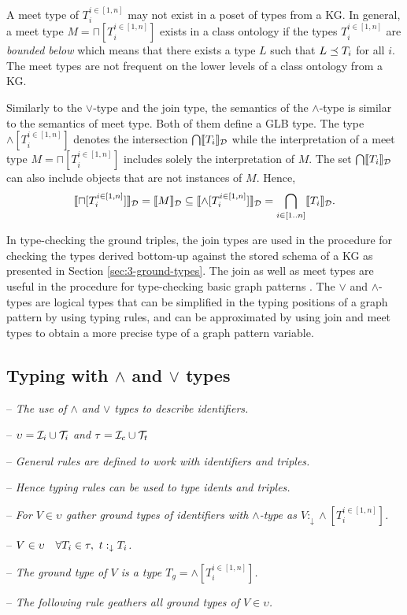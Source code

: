 \documentclass[runningheads]{llncs}
\newcommand{\darr}{\downarrow}
\newcommand{\llb}{\llbracket}
\newcommand{\rrb}{\rrbracket}
\newcommand{\I}{{\cal I}}
\newcommand{\T}{{\cal T}}
\newcommand{\notes}[1]{\noindent\begin{small}-- \emph{#1}\hfill\break\end{small}}
\newcommand{\nnotes}[1]{\indent\begin{small}-- \emph{#1}\hfill\break\end{small}}
\newcommand{\ennotes}[1]{\indent\begin{small}-- \emph{#1}\hfill\end{small}}
\begin{document}
A meet type of $T_i^{i\in[1,n]}$ may not exist in a poset of types from a
KG. In general, a meet type $M=\sqcap[T_i^{i\in[1,n]}]$ exists in a class
ontology if the types $T_i^{i\in[1,n]}$ are \emph{bounded below} which means
that there exists a type $L$ such that $L\preceq\/T_i$ for all
$i$. The meet types \cite{Pierce2002} are not frequent on the
lower levels of a class ontology from a KG.

Similarly to the $\lor$-type and the join type, the semantics of the
$\land$-type is similar to the semantics of meet type. Both of them
define a GLB type. The type $\land[T_i^{i\in[1,n]}]$ denotes the intersection
$\bigcap\/\llb\/T_i\rrb_\D$ while the interpretation of a meet type
$M=\sqcap[T_i^{i\in[1,n]}]$ includes solely the interpretation of $M$. The
set $\bigcap\/\llb\/T_i\rrb_\D$ can also include objects that are not
instances of $M$. Hence,
$$\llb\sqcap[T_i^{i\in[1,n]}]\rrb_\D=\llb\/M\rrb_\D\subseteq\llb\land[T_i^{i\in[1,n]}]\rrb_\D=\bigcap_{i\in[1..n]}\/\llb\/T_i\rrb_\D.$$

In type-checking the ground triples, the join types are used in the
procedure for checking the types derived bottom-up against the stored
schema of a KG as presented in Section \ref{sec:3-ground-types}. The
join as well as meet types are useful in the procedure for
type-checking basic graph patterns \cite{Savnik2025a}. The $\lor$ and
$\land$-types are logical types that can be simplified in the typing
positions of a graph pattern by using typing rules, and can be
approximated by using join and meet types to obtain a more precise
type of a graph pattern variable.




\subsection{Typing with $\land$ and $\lor$ types}

\medskip
\notes{The use of $\land$ and $\lor$ types to describe identifiers.}
\nnotes{$\upsilon=\I_i\cup\T_i$ and $\tau=\I_c\cup\T_t$}
\nnotes{General rules are defined to work with identifiers and triples.}
\nnotes{Hence typing rules can be used to type idents and triples.}

\notes{For $V\in\upsilon$ gather ground types of identifiers with $\land$-type as $V:_{\darr}\land[T_i^{i\in[1,n]}]$.}
\nnotes{$V\in\upsilon\quad\forall\/T_i\in\tau,\ t:_{\darr}T_i$.}
\nnotes{The ground type of $V$ is a type $T_g=\land[T_i^{i\in[1,n]}]$.}
\ennotes{The following rule geathers all ground types of $V\in\upsilon$.}
\end{document}
